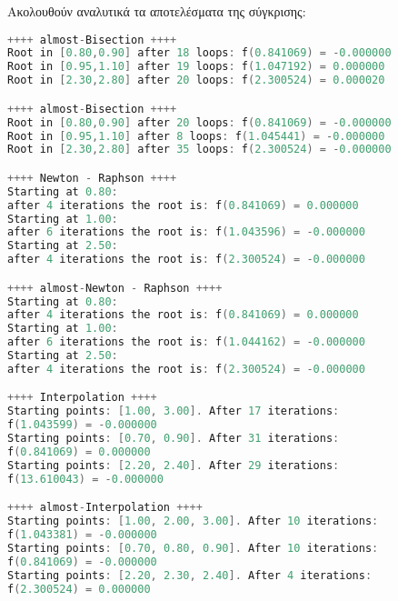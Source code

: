 Ακολουθούν αναλυτικά τα αποτελέσματα της σύγκρισης:
\begin{lstlisting}[language=C, mathescape=true]
++++ almost-Bisection ++++
Root in [0.80,0.90] after 18 loops: f(0.841069) = -0.000000
Root in [0.95,1.10] after 19 loops: f(1.047192) = 0.000000
Root in [2.30,2.80] after 20 loops: f(2.300524) = 0.000020

++++ almost-Bisection ++++
Root in [0.80,0.90] after 20 loops: f(0.841069) = -0.000000
Root in [0.95,1.10] after 8 loops: f(1.045441) = -0.000000
Root in [2.30,2.80] after 35 loops: f(2.300524) = -0.000000

++++ Newton - Raphson ++++
Starting at 0.80:
after 4 iterations the root is: f(0.841069) = 0.000000
Starting at 1.00:
after 6 iterations the root is: f(1.043596) = -0.000000
Starting at 2.50:
after 4 iterations the root is: f(2.300524) = -0.000000

++++ almost-Newton - Raphson ++++
Starting at 0.80:
after 4 iterations the root is: f(0.841069) = 0.000000
Starting at 1.00:
after 6 iterations the root is: f(1.044162) = -0.000000
Starting at 2.50:
after 4 iterations the root is: f(2.300524) = -0.000000

++++ Interpolation ++++
Starting points: [1.00, 3.00]. After 17 iterations:
f(1.043599) = -0.000000
Starting points: [0.70, 0.90]. After 31 iterations:
f(0.841069) = 0.000000
Starting points: [2.20, 2.40]. After 29 iterations:
f(13.610043) = -0.000000

++++ almost-Interpolation ++++
Starting points: [1.00, 2.00, 3.00]. After 10 iterations:
f(1.043381) = -0.000000
Starting points: [0.70, 0.80, 0.90]. After 10 iterations:
f(0.841069) = -0.000000
Starting points: [2.20, 2.30, 2.40]. After 4 iterations:
f(2.300524) = 0.000000
\end{lstlisting}










